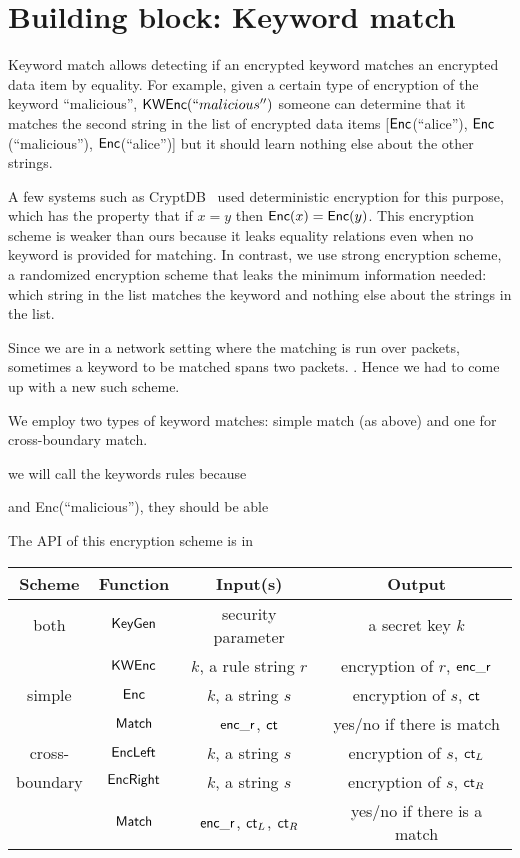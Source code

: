 


\section{Building block: Keyword match}


%

Keyword match allows detecting if an encrypted keyword matches an encrypted data item by equality.
For example, given a certain type of encryption of the keyword ``malicious'', $\mathsf{KWEnc}(``malicious'')$ someone can determine that it matches the second string in the list of encrypted data items [$\mathsf{Enc}$(``alice''), $\mathsf{Enc}$(``malicious''), $\mathsf{Enc}$(``alice'')] but it should learn nothing else about the other strings.

A few systems such as CryptDB~\cite{cryptdb, someother} used deterministic encryption for this purpose, which has the property that if $x = y$ then $\mathsf{Enc}(x) = \mathsf{Enc}(y)$. This encryption scheme is weaker than ours because it leaks equality relations even when no keyword is provided for matching. In contrast, we use strong encryption scheme, a randomized encryption scheme that leaks the minimum information needed: which string in the list matches the keyword and nothing else about the strings in the list. 

Since we are in a network setting where the matching is run over packets, sometimes a keyword to be matched spans two packets. . Hence we had to come up with a new such scheme. 

We employ two types of keyword matches: simple match (as above) and one for cross-boundary match. 


we will call the keywords rules because 

 and Enc(``malicious''), they should be able 

The API of this encryption scheme is in 


\begin{tabular}{c|c|c|c}
Scheme    & Function        & Input(s) & Output \\
\hline
 both                & $\mathsf{KeyGen}$     & security parameter	      & a secret key $k$ \\ 
                 & $\mathsf{KWEnc}$	& $k$, a rule string $r$   &  encryption of $r$, $\mathsf{enc\_r}$ \\
\hline
  simple               & $\mathsf{Enc}$           &  $k$, a string $s$                        &  encryption of $s$, $\mathsf{ct}$          \\
                 & $\mathsf{Match}$  & $\mathsf{enc\_r}$, $\mathsf{ct}$ & yes/no if there is match \\
\hline
  cross-               & $\mathsf{EncLeft}$  & $k$, a string $s$ &encryption of $s$, $\mathsf{ct}_L$   \\
   boundary              & $\mathsf{EncRight}$ & $k$, a string $s$ & encryption of $s$, $\mathsf{ct}_R$  \\
                 & $\mathsf{Match}$ & $\mathsf{enc\_r}$, $\mathsf{ct}_L$, $\mathsf{ct}_R$ & yes/no if there is a match \\
\end{tabular}

